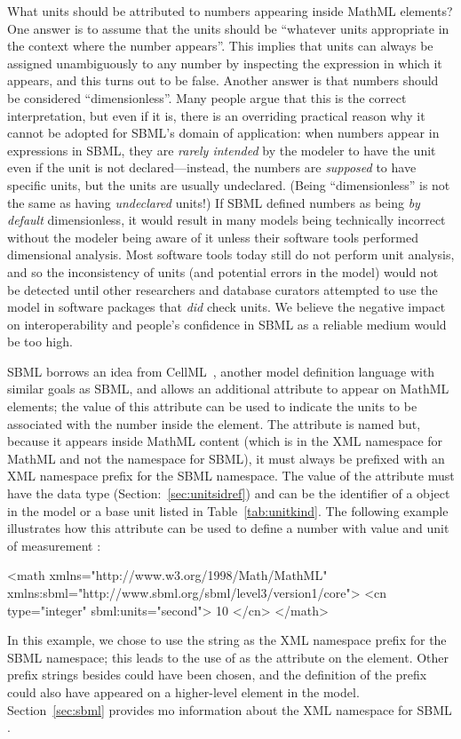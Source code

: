 What units should be attributed to numbers appearing inside MathML
 elements?  One answer is to assume that the units
should be ``whatever units appropriate in the context where the
number appears''.  This implies that units can always be assigned
unambiguously to any number by inspecting the expression in which
it appears, and this turns out to be false.  Another answer is
that numbers should be considered ``dimensionless''.  Many people
argue that this is the correct interpretation, but even if it is,
there is an overriding practical reason why it cannot be adopted
for SBML's domain of application: when numbers appear in
expressions in SBML, they are \emph{rarely intended} by the
modeler to have the unit  even if the unit is
not declared---instead, the numbers are \emph{supposed} to have
specific units, but the units are usually undeclared.  (Being
``dimensionless'' is not the same as having \emph{undeclared}
units!)  If SBML defined numbers as being \emph{by default}
dimensionless, it would result in many models being technically
incorrect without the modeler being aware of it unless their
software tools performed dimensional analysis.  Most software
tools today still do not perform unit analysis, and so the
inconsistency of units (and potential errors in the model) would
not be detected until other researchers and database curators
attempted to use the model in software packages that \emph{did}
check units.  We believe the negative impact on interoperability
and people's confidence in SBML as a reliable medium would be too
high.

SBML borrows an idea from CellML~\citep{hedley:2001b}, another
model definition language with similar goals as SBML, and allows
an additional attribute to appear on MathML  elements;
the value of this attribute can be used to indicate the units to
be associated with the number inside the  element.  The
attribute is named  but, because it appears inside
MathML content (which is in the XML namespace for MathML and not
the namespace for SBML), it must always be prefixed with an XML
namespace prefix for the SBML \thisLV namespace.  The value of the
attribute must have the data type 
(Section:~\vref{sec:unitsidref}) and can be the identifier of a
\UnitDefinition object in the model or a base unit listed in
Table~\vref{tab:unitkind}.  The following example illustrates how
this attribute can be used to define a number with value 
and unit of measurement :
\begin{example}
<math xmlns="http://www.w3.org/1998/Math/MathML"
      xmlns:sbml="http://www.sbml.org/sbml/level3/version1/core">
    <cn type="integer" sbml:units="second"> 10 </cn>
</math>
\end{example} 
In this example, we chose to use the string  as the XML
namespace prefix for the SBML \thisLV namespace; this leads to the
use of  as the attribute on the 
element.  Other prefix strings besides  could have been
chosen, and the definition of the prefix could also have appeared
on a higher-level element in the model.  Section~\ref{sec:sbml}
provides mo information about the XML namespace for SBML \thisLV.

